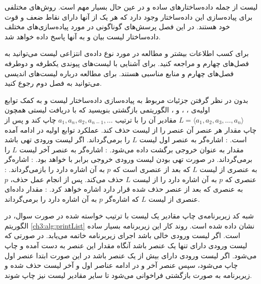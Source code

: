 
لیست‌ از جمله داده‌ساختارهای ساده و در عین حال بسیار مهم است. روش‌های مختلفی برای پیاده‌سازی این داده‌ساختار وجود دارد که هر یک از آنها دارای نقاط ضعف و قوت خود هستند. در این فصل پرسش‌های گوناگونی در مورد پیاده‌سازی‌های مختلف داده‌ساختار لیست بیان و به آنها پاسخ داده خواهد شد.

برای کسب اطلاعات بیشتر و مطالعه در مورد نوع داده‌ی انتزاعی لیست می‌توانید به فصل‌های چهارم {\cite{ebrahimi}} و {\cite{horowitz}} مراجعه کنید. برای آشنایی با لیست‌های پیوندی یکطرفه و دوطرفه فصل‌های چهارم {\cite{ebrahimi}} و {\cite{shaffer}} منابع مناسبی هستند. برای مطالعه درباره لیست‌های اندیسی می‌توانید به فصل دوم {\cite{aho}} رجوع کنید.


 بدون در نظر گرفتن جزئیات مربوط به پیاده‌سازی داده‌ساختار لیست و به کمک توابع اولیه‌ی {}،  {}، {} و {}، الگوریتمی بازگشتی بنویسید که با دریافت لیستی همچون {$L=\langle a_1,a_2,a_3,\ldots,a_n\rangle$} مقادیر آن را با ترتیب {$a_1,a_n,a_2,a_{n-1},\ldots$} چاپ کند و پس از چاپ مقدار هر عنصر آن عنصر را از لیست حذف کند. عملکرد توابع اولیه در ادامه آمده است.
: اشاره‌گر به عنصر اول لیست {$L$} را برمی‌گرداند. اگر لیست ورودی تهی باشد مقدار {} به عنوان خروجی برگشت داده می‌شود.
: اشاره‌گر به عنصر آخر لیست {$L$} را برمی‌گرداند. در صورت تهی بودن لیست ورودی خروجی برابر با {} خواهد بود.
: اشاره‌گر به عنصری از لیست {$L$} که بعد از عنصری است که {$p$} به آن اشاره دارد را بازمی‌گرداند.
: عنصری که {$p$} به آن اشاره دارد را از لیست {$L$} حذف می‌کند. پس از انجام عمل حذف، {$p$} به عنصری که بعد از عنصر حذف شده قرار دارد اشاره خواهد کرد.
: مقدار داده‌ای عنصری از لیست {$L$} که اشاره‌گر {$p$} به آن اشاره دارد را برمی‌گرداند.


شبه کد زیربرنامه‌ی چاپ مقادیر یک لیست با ترتیب خواسته شده در صورت سوال، در الگوریتم {\eqref{ch3:alg:printList}} نشان داده شده است. روند کار این زیربرنامه بسیار ساده است. اگر لیست ورودی خالی باشد اجرای زیربرنامه خاتمه می‌یابد. در صورتی که لیست ورودی دارای تنها یک عنصر باشد آنگاه مقدار این عنصر به دست آمده و چاپ می‌شود. اگر لیست ورودی دارای بیش از یک عنصر باشد در این صورت ابتدا عنصر اول چاپ می‌شود، سپس عنصر آخر و در ادامه عناصر اول و آخر لیست حذف شده و زیربرنامه به صورت بازگشتی فراخوانی می‌شود تا سایر مقادیر لیست نیز چاپ شوند.

